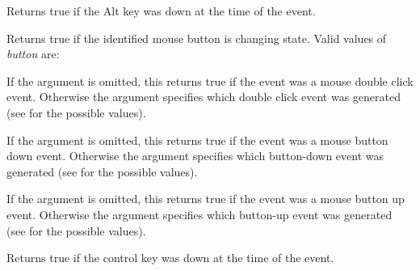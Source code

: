 

Returns true if the Alt key was down at the time of the event.

\label{wxmouseeventbutton}


Returns true if the identified mouse button is changing state. Valid
values of {\it button} are:

\begin{twocollist}\itemsep=0pt
\end{twocollist}



If the argument is omitted, this returns true if the event was a mouse
double click event. Otherwise the argument specifies which double click event
was generated (see  for the possible
values).



If the argument is omitted, this returns true if the event was a mouse
button down event. Otherwise the argument specifies which button-down event
was generated (see  for the possible
values).




If the argument is omitted, this returns true if the event was a mouse
button up event. Otherwise the argument specifies which button-up event
was generated (see  for the possible
values).




Returns true if the control key was down at the time of the event.

